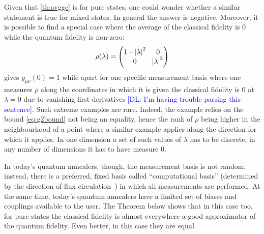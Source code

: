 \documentclass[american,aps,pra,reprint,floatfix,nofootinbib,superscriptaddress]{revtex4-2}
\newcommand{\DL}[1]{\textcolor{blue}{[DL: #1]}}
\begin{document}
Given that \cref{th:avggc} is for pure states, one could wonder
whether a similar statement is true for mixed states. In general the answer
is negative. Moreover, it is possible to find a special case where
the average of the classical fidelity is 0 while the quantum fidelity
is non-zero:
\begin{equation}
  \rho(\lambda) =
    \begin{pmatrix}
      1 - \abs{\lambda}^2 & 0 \\
      0 & \abs{\lambda}^2
    \end{pmatrix}
\end{equation}
gives $g_{\mu\nu}(0) = 1$ while apart for one specific measurement basis where
one measures $\rho$ along the coordinates in which it is given
the classical fidelity is $0$ at $\lambda=0$ due to vanishing first derivatives \DL{I'm having trouble parsing this sentence}.
Such extreme examples are rare. Indeed, the example relies on the bound
\eqref{eq:g2bound} not being an equality, hence the rank of $\rho$
being higher in the neighbourhood of a point where a similar example applies
along the direction for which it applies. In one dimension 
a set of such values of $\lambda$ has to be discrete, in any number of
dimensions it has to have measure $0$.

In today's quantum annealers, though, the measurement basis is not random:
instead, there is a preferred, fixed basis called ``computational basis'' (determined by the direction of flux circulation~\cite{Berkley:2010zr}) in which
all measurements are performed. At the same time, today's quantum annealers
have a limited set of biases and couplings available to the user. The Theorem below
shows that in this case too, for pure states the classical fidelity is almost
everywhere a good approximator of the quantum fidelity. Even better, in this
case they are equal.
\end{document}
